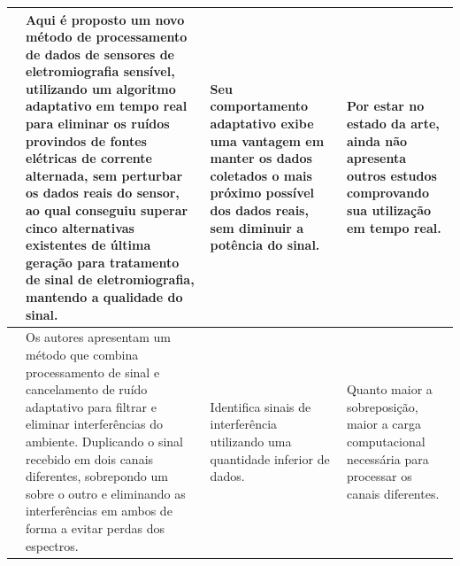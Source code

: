 \begin{longtable}{|p{2cm}|p{4cm}|p{3.5cm}|p{3.5cm}|}
    \cite{Kaan_emg} &   Aqui é proposto um novo método de processamento de dados de sensores de eletromiografia sensível, utilizando um algoritmo adaptativo em tempo real para eliminar os ruídos provindos de fontes elétricas de corrente alternada, sem perturbar os dados reais do sensor, ao qual conseguiu superar cinco alternativas existentes de última geração para tratamento de sinal de eletromiografia, mantendo a qualidade do sinal.  &  Seu comportamento adaptativo exibe uma vantagem em manter os dados coletados o mais próximo possível dos dados reais, sem diminuir a potência do sinal. & Por estar no estado da arte, ainda não apresenta outros estudos comprovando sua utilização em tempo real. \\ \hline
    
    \cite{Zhou_ambient} &   Os autores apresentam um método que combina processamento de sinal e cancelamento de ruído adaptativo para filtrar e eliminar interferências do ambiente. Duplicando o sinal recebido em dois canais diferentes, sobrepondo um sobre o outro e eliminando as interferências em ambos de forma a evitar perdas dos espectros. &   Identifica sinais de interferência utilizando uma quantidade inferior de dados. & Quanto maior a sobreposição, maior a carga computacional necessária para processar os canais diferentes. \\ \hline
    
\end{longtable}




